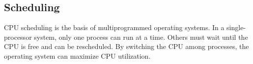 \subsection{Scheduling}\label{subsec:Scheduling}
CPU scheduling is the basis of multiprogrammed operating systems.
In a single-processor system, only one process can run at a time.
Others must wait until the CPU is free and can be rescheduled.
By switching the CPU among processes, the operating system can maximize CPU utilization.



